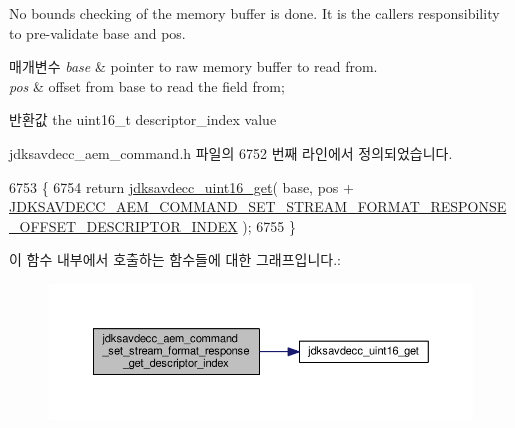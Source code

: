 No bounds checking of the memory buffer is done. It is the caller\textquotesingle{}s responsibility to pre-\/validate base and pos.


\begin{DoxyParams}{매개변수}
{\em base} & pointer to raw memory buffer to read from. \\
\hline
{\em pos} & offset from base to read the field from; \\
\hline
\end{DoxyParams}
\begin{DoxyReturn}{반환값}
the uint16\+\_\+t descriptor\+\_\+index value 
\end{DoxyReturn}


jdksavdecc\+\_\+aem\+\_\+command.\+h 파일의 6752 번째 라인에서 정의되었습니다.


\begin{DoxyCode}
6753 \{
6754     \textcolor{keywordflow}{return} \hyperlink{group__endian_ga3fbbbc20be954aa61e039872965b0dc9}{jdksavdecc\_uint16\_get}( base, pos + 
      \hyperlink{group__command__set__stream__format__response_ga3fb2a3f714c01e45626ae8439f9d9793}{JDKSAVDECC\_AEM\_COMMAND\_SET\_STREAM\_FORMAT\_RESPONSE\_OFFSET\_DESCRIPTOR\_INDEX}
       );
6755 \}
\end{DoxyCode}


이 함수 내부에서 호출하는 함수들에 대한 그래프입니다.\+:
\nopagebreak
\begin{figure}[H]
\begin{center}
\leavevmode
\includegraphics[width=350pt]{group__command__set__stream__format__response_gad537666f50834335936b9c8147d02110_cgraph}
\end{center}
\end{figure}




